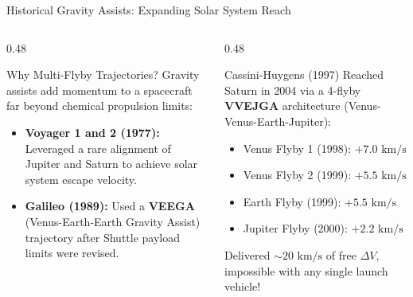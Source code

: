 \documentclass[aspectratio=169, 10pt]{beamer}
\begin{document}
\begin{frame}{Historical Gravity Assists: Expanding Solar System Reach}
    \begin{columns}[t]
        \begin{column}{0.48\textwidth}
            \begin{block}{Why Multi-Flyby Trajectories?}
                \scriptsize
                Gravity assists add momentum to a spacecraft far beyond chemical propulsion limits:
                \begin{itemize}\setlength{\itemsep}{1.5pt}
                    \item \textbf{Voyager 1 and 2 (1977):} Leveraged a rare alignment of Jupiter and Saturn to achieve solar system escape velocity.
                    \item \textbf{Galileo (1989):} Used a \textbf{VEEGA} (Venus-Earth-Earth Gravity Assist) trajectory after Shuttle payload limits were revised.
                \end{itemize}
            \end{block}
        \end{column}

        \begin{column}{0.48\textwidth}
            \begin{exampleblock}{Cassini-Huygens (1997)}
                \scriptsize
                Reached Saturn in 2004 via a 4-flyby \textbf{VVEJGA} architecture (Venus-Venus-Earth-Jupiter):
                \begin{itemize}\setlength{\itemsep}{1.5pt}
                    \item Venus Flyby 1 (1998): $+7.0\text{ km/s}$
                    \item Venus Flyby 2 (1999): $+5.5\text{ km/s}$
                    \item Earth Flyby (1999): $+5.5\text{ km/s}$
                    \item Jupiter Flyby (2000): $+2.2\text{ km/s}$
                \end{itemize}
                Delivered $\sim 20\text{ km/s}$ of free $\Delta V$, impossible with any single launch vehicle!
            \end{exampleblock}
        \end{column}
    \end{columns}
\end{frame}
\end{document}
